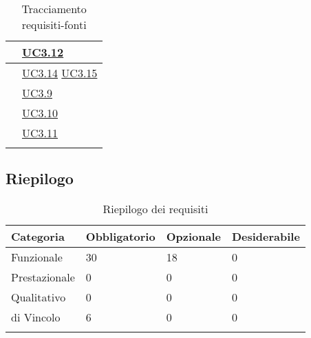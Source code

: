 \begin{longtable}{|P{6cm}|P{6cm}|}
	\hline {} & \hyperref[UC3.12]{UC3.12} \\
	\hline {} & \hyperref[UC3.14]{UC3.14} \linebreak \hyperref[UC3.15]{UC3.15} \\
	\hline {} & \hyperref[UC3.9]{UC3.9} \\
	\hline {} & \hyperref[UC3.10]{UC3.10} \\
	\hline {} & \hyperref[UC3.11]{UC3.11} \\	
	\hline
	\caption{Tracciamento requisiti-fonti}
\end{longtable}

\subsection{Riepilogo}

\begin{longtable}{|P{3cm}|P{3cm}|P{3cm}|P{3cm}|}
	\hline \textbf{Categoria} & \textbf{Obbligatorio} & \textbf{Opzionale} & \textbf{Desiderabile} \\
	\hline Funzionale & 30 & 18 & 0 \\
	\hline Prestazionale & 0 & 0 & 0 \\
	\hline Qualitativo & 0 & 0 & 0 \\
	\hline di Vincolo & 6 & 0 & 0 \\
	\hline
	\caption{Riepilogo dei requisiti}
\end{longtable}
